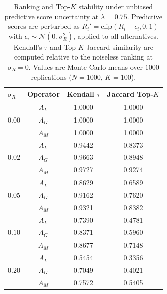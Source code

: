 \begin{table}[H]
\caption{Ranking and Top-$K$ stability under unbiased predictive score
uncertainty at $\lambda=0.75$. Predictive scores are perturbed as
$R_i'=\mathrm{clip}(R_i+\epsilon_i,0,1)$ with
$\epsilon_i\sim\mathcal{N}(0,\sigma_R^2)$, applied to all alternatives.
Kendall's $\tau$ and Top-$K$ Jaccard similarity are computed relative to
the noiseless ranking at $\sigma_R=0$. Values are Monte Carlo means over
$1000$ replications ($N=1000$, $K=100$).}
\label{tab:score-stability}
\centering
\small
\renewcommand{\arraystretch}{1.2}
\begin{tabular}{lccc}
\toprule
$\sigma_R$ & Operator & Kendall $\tau$ & Jaccard Top-$K$ \\
\midrule
\multirow{3}{*}{$0.00$} & $A_L$ & 1.0000 & 1.0000 \\
 & $A_G$ & 1.0000 & 1.0000 \\
 & $A_M$ & 1.0000 & 1.0000 \\
\midrule
\multirow{3}{*}{$0.02$} & $A_L$ & 0.9442 & 0.8373 \\
 & $A_G$ & 0.9663 & 0.8948 \\
 & $A_M$ & 0.9727 & 0.9274 \\
\midrule
\multirow{3}{*}{$0.05$} & $A_L$ & 0.8629 & 0.6589 \\
 & $A_G$ & 0.9162 & 0.7620 \\
 & $A_M$ & 0.9321 & 0.8382 \\
\midrule
\multirow{3}{*}{$0.10$} & $A_L$ & 0.7390 & 0.4781 \\
 & $A_G$ & 0.8371 & 0.5960 \\
 & $A_M$ & 0.8677 & 0.7148 \\
\midrule
\multirow{3}{*}{$0.20$} & $A_L$ & 0.5454 & 0.3356 \\
 & $A_G$ & 0.7049 & 0.4021 \\
 & $A_M$ & 0.7572 & 0.5405 \\
\bottomrule
\end{tabular}
\end{table}
